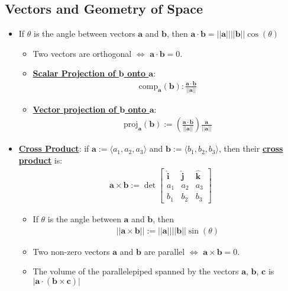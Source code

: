 \documentclass[11pt]{article}
\newcommand{\dfn}[1]{\underline{\textbf{#1}}}
\begin{document}
\subsection{Vectors and Geometry of Space}
\begin{itemize}[noitemsep]
	\item If $\theta$ is the angle between vectors $\mathbf{a}$ and $\mathbf{b}$, then $\mathbf{a} \cdot \mathbf{b} = ||\mathbf{a}|| || \mathbf{b} || \cos (\theta)$ 
	\begin{itemize}[noitemsep]
		\item Two vectors are orthogonal $\iff$ $\mathbf{a} \cdot \mathbf{b} = 0$. 
		\item \dfn{Scalar Projection of $\mathbf{b}$ onto $\mathbf{a}$}: 
		\begin{align}
			\text{comp}_{ \mathbf{a}} ( \mathbf{b}) : \frac{\mathbf{a} \cdot \mathbf{b} }{||\mathbf{a}|| }	
		\end{align}
		\item \dfn{Vector projection of $\mathbf{b}$ onto $\mathbf{a}$}: 
		\begin{align}
			\text{proj}_{\mathbf{a}} (\mathbf{b}) 	:= \left( \frac{\mathbf{a} \cdot \mathbf{b}}{|| \mathbf{a}|| } \right) \frac{\mathbf{a}}{|| \mathbf{a}||}
		\end{align}
	\end{itemize}
	\item \dfn{Cross Product}: if $\mathbf{a} := \langle a_1, a_2, a_3 \rangle$ and $\mathbf{b} := \langle b_1, b_2, b_3 \rangle$, then their \dfn{cross product} is:
	\begin{align}
		\mathbf{a} \times \mathbf{b} := \det \begin{bmatrix}
			\mathbf{\hat{i}} & \mathbf{\hat{j}} & \mathbf{\hat{k}} \\
			a_1 & a_2 & a_3 \\
			b_1 & b_2 & b_3 
		\end{bmatrix}	
	\end{align}	
	\begin{itemize}[noitemsep]
		\item If $\theta$ is the angle between $\mathbf{a}$ and $\mathbf{b}$, then 
		\begin{align}
			||\mathbf{a} \times \mathbf{b} || := || \mathbf{a}|| || \mathbf{b} || \sin (\theta) 	
		\end{align}
		\item Two non-zero vectors $\mathbf{a}$ and $\mathbf{b}$ are parallel $\iff$ $\mathbf{a} \times \mathbf{b} = 0$. 
		\item The volume of the parallelepiped spanned by the vectors $\mathbf{a}$, $\mathbf{b}$, $\mathbf{c}$ is $| \mathbf{a} \cdot ( \mathbf{b} \times \mathbf{c} ) | $

\end{itemize}
\end{itemize}
\end{document}

